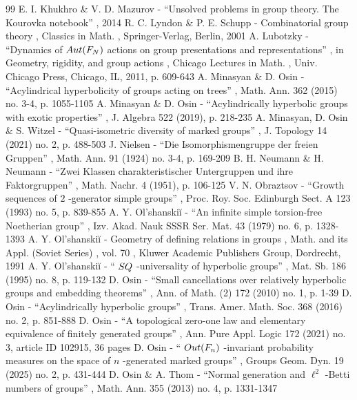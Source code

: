 \documentclass[11pt]{article}
\theoremstyle{definition}
\begin{document}
\begin{thebibliography}{99}
 E. I. Khukhro \& V. D. Mazurov - “Unsolved problems in group theory. The Kourovka notebook” , 2014
 R. C. Lyndon \& P. E. Schupp - Combinatorial group theory , Classics in Math. , Springer-Verlag, Berlin, 2001
 A. Lubotzky - “Dynamics of ${\rm Aut}(F_N)$ actions on group presentations and representations” , in Geometry, rigidity, and group actions , Chicago Lectures in Math. , Univ. Chicago Press, Chicago, IL, 2011, p. 609-643
 A. Minasyan \& D. Osin - “Acylindrical hyperbolicity of groups acting on trees” , Math. Ann. 362 (2015) no. 3-4, p. 1055-1105
 A. Minasyan \& D. Osin - “Acylindrically hyperbolic groups with exotic properties” , J. Algebra 522 (2019), p. 218-235
 A. Minasyan, D. Osin \& S. Witzel - “Quasi-isometric diversity of marked groups” , J. Topology 14 (2021) no. 2, p. 488-503
 J. Nielsen - “Die Isomorphismengruppe der freien Gruppen” , Math. Ann. 91 (1924) no. 3-4, p. 169-209
 B. H. Neumann \& H. Neumann - “Zwei Klassen charakteristischer Untergruppen und ihre Faktorgruppen” , Math. Nachr. 4 (1951), p. 106-125
 V. N. Obraztsov - “Growth sequences of $2$ -generator simple groups” , Proc. Roy. Soc. Edinburgh Sect. A 123 (1993) no. 5, p. 839-855
 A. Y. Ol’shanskiĭ - “An infinite simple torsion-free Noetherian group” , Izv. Akad. Nauk SSSR Ser. Mat. 43 (1979) no. 6, p. 1328-1393
 A. Y. Ol’shanskiĭ - Geometry of defining relations in groups , Math. and its Appl. (Soviet Series) , vol. 70 , Kluwer Academic Publishers Group, Dordrecht, 1991
 A. Y. Ol’shanskiĭ - “ ${\rm SQ}$ -universality of hyperbolic groups” , Mat. Sb. 186 (1995) no. 8, p. 119-132
 D. Osin - “Small cancellations over relatively hyperbolic groups and embedding theorems” , Ann. of Math. (2) 172 (2010) no. 1, p. 1-39
 D. Osin - “Acylindrically hyperbolic groups” , Trans. Amer. Math. Soc. 368 (2016) no. 2, p. 851-888
 D. Osin - “A topological zero-one law and elementary equivalence of finitely generated groups” , Ann. Pure Appl. Logic 172 (2021) no. 3, article ID 102915, 36 pages
 D. Osin - “ ${\rm Out}(F_n)$ -invariant probability measures on the space of $n$ -generated marked groups” , Groups Geom. Dyn. 19 (2025) no. 2, p. 431-444
 D. Osin \& A. Thom - “Normal generation and $\ell ^2$ -Betti numbers of groups” , Math. Ann. 355 (2013) no. 4, p. 1331-1347

\end{thebibliography}
\end{document}
